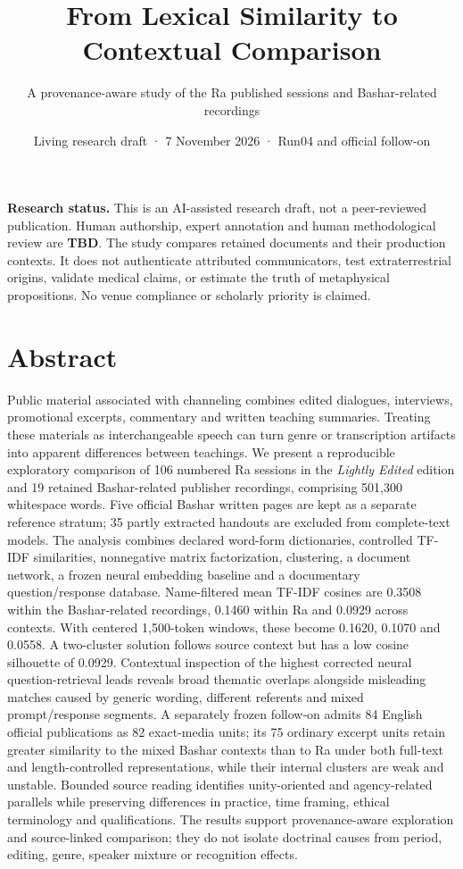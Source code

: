 \documentclass[
  11pt,
]{article}
\title{From Lexical Similarity to Contextual Comparison}
\subtitle{A provenance-aware study of the Ra published sessions and
Bashar-related recordings}
\author{}
\date{Living research draft · 7 November 2026 · Run04 and official
follow-on}
\begin{document}
\maketitle

\textbf{Research status.} This is an AI-assisted research draft, not a
peer-reviewed publication. Human authorship, expert annotation and human
methodological review are \textbf{TBD}. The study compares retained
documents and their production contexts. It does not authenticate
attributed communicators, test extraterrestrial origins, validate
medical claims, or estimate the truth of metaphysical propositions. No
venue compliance or scholarly priority is claimed.

\FloatBarrier

\section{Abstract}\label{abstract}

Public material associated with channeling combines edited dialogues,
interviews, promotional excerpts, commentary and written teaching
summaries. Treating these materials as interchangeable speech can turn
genre or transcription artifacts into apparent differences between
teachings. We present a reproducible exploratory comparison of 106
numbered Ra sessions in the \emph{Lightly Edited} edition and 19
retained Bashar-related publisher recordings, comprising 501,300
whitespace words. Five official Bashar written pages are kept as a
separate reference stratum; 35 partly extracted handouts are excluded
from complete-text models. The analysis combines declared word-form
dictionaries, controlled TF-IDF similarities, nonnegative matrix
factorization, clustering, a document network, a frozen neural embedding
baseline and a documentary question/response database. Name-filtered
mean TF-IDF cosines are 0.3508 within the Bashar-related recordings,
0.1460 within Ra and 0.0929 across contexts. With centered 1,500-token
windows, these become 0.1620, 0.1070 and 0.0558. A two-cluster solution
follows source context but has a low cosine silhouette of 0.0929.
Contextual inspection of the highest corrected neural question-retrieval
leads reveals broad thematic overlaps alongside misleading matches
caused by generic wording, different referents and mixed prompt/response
segments. A separately frozen follow-on admits 84 English official
publications as 82 exact-media units; its 75 ordinary excerpt units
retain greater similarity to the mixed Bashar contexts than to Ra under
both full-text and length-controlled representations, while their
internal clusters are weak and unstable. Bounded source reading
identifies unity-oriented and agency-related parallels while preserving
differences in practice, time framing, ethical terminology and
qualifications. The results support provenance-aware exploration and
source-linked comparison; they do not isolate doctrinal causes from
period, editing, genre, speaker mixture or recognition effects.
\end{document}
